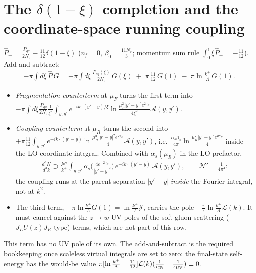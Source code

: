 \documentclass[10pt]{article}
\newcommand{\Lc}{\mathcal L}
\newcommand{\Jc}{\mathcal J}
\newcommand{\Ac}{\mathcal A}
\newcommand{\Nn}{\mathcal N}
\newcommand{\Ph}{\hat P}
\begin{document}
\section{The $\delta(1-\xi)$ completion and the coordinate-space running coupling}
$\Ph_{+}=\frac{P_{gg}}{2N_c}-\frac{11}{12}\delta(1-\xi)$ ($n_f=0$, $\beta_0=\frac{11N_c}{3}$;
momentum sum rule $\int_{0}^{1}\xi\Ph_{+}=-\frac{11}{12}$). Add and subtract:
\begin{align}
-\pi\!\int\!d\xi\,\Ph\,G
=-\pi\!\int\!d\xi\,\frac{P_{gg}(\xi)}{2N_c}\,G(\xi)\;+\;\pi\,\frac{11}{12}\,G(1)\;-\;\pi\ln\frac{k^{+}}{\Lambda}\,G(1).
\end{align}
\begin{itemize}
\item \emph{Fragmentation counterterm} at $\mu_F$ turns the first term into
$-\pi\int d\xi\frac{P_{gg}}{2N_c}\frac{1}{\xi^{2}}\int_{y,y'}e^{-ik\cdot(y'-y)/\xi}\ln\frac{\mu_F^{2}|y'-y|^{2}e^{2\gamma_E}}{4\xi^{2}}\Ac(y,y')$.
\item \emph{Coupling counterterm} at $\mu_R$ turns the second into
$+\pi\frac{11}{12}\int_{y,y'}e^{-ik\cdot(y'-y)}\ln\frac{\mu_R^{2}|y'-y|^{2}e^{2\gamma_E}}{4}\Ac(y,y')$,
i.e.\ $\frac{\alpha_s\beta_0}{4\pi}\ln\frac{\mu_R^{2}|y'-y|^{2}e^{2\gamma_E}}{4}$ inside the LO
coordinate integral. Combined with $\alpha_s(\mu_R)$ in the LO prefactor,
\begin{align}\label{eq:rc}
\frac{d^{3}N}{d^{3}k}\supset\frac{\Nn'}{k^{+}}\int_{y,y'}\alpha_s\Big(\frac{4e^{-2\gamma_E}}{|y'-y|^{2}}\Big)\,e^{-ik\cdot(y'-y)}\,\Ac(y,y'),\qquad\Nn'=\frac{1}{4\pi^{4}}:
\end{align}
the coupling runs at the parent separation $|y'-y|$ \emph{inside} the Fourier integral, not at
$k^{2}$.
\item The third term, $-\pi\ln\frac{k^{+}}{\Lambda}G(1)=\ln\frac{k^{+}}{\Lambda}\Jc$, carries the
pole $-\frac\pi\epsilon\ln\frac{k^{+}}{\Lambda}\Lc(k)$. It must cancel against the $z\to w$ UV poles
of the soft-gluon-scattering ($J_LU(z)J_R$-type) terms, which are not part of this row.
\end{itemize}
This term has no UV pole of its own. The add-and-subtract is the required bookkeeping once
scaleless virtual integrals are set to zero: the final-state self-energy has the would-be value
$\pi[\ln\frac{k^{+}}{\Lambda}-\frac{11}{12}]\Lc(k)(\frac{1}{\epsilon_{\rm IR}}-\frac{1}{\epsilon_{\rm UV}})\equiv0$.
\end{document}
